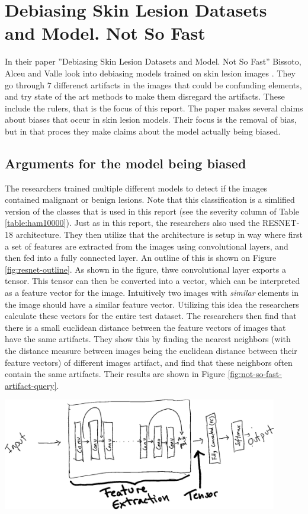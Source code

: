 \section{Debiasing Skin Lesion Datasets and Model. Not So Fast}\label{sec:debias-not-so-fast}
In their paper
''Debiasing Skin Lesion Datasets and Model. Not So Fast''
Bissoto, Alceu and Valle look into debiasing models trained on
skin lesion images \cite{debias-not-so-fast}.
They go through $7$ differenct artifacts in the images that could
be confunding elements, and try state of the art methods to
make them disregard the artifacts.
These include the rulers, that is the focus of this report.
The paper makes several claims about biases that occur in
skin lesion models.
Their focus is the removal of bias, but in that proces they
make claims about the model actually being biased.

\subsection{Arguments for the model being biased}
The researchers trained multiple different models to detect if the
images contained malignant or benign lesions.
Note that this classification is a simlified version of the classes
that is used in this report (see the severity column of Table \ref{table:ham10000}).
Just as in this report, the researchers also used the RESNET-18 architecture.
They then utilize that the architecture is setup in way where first a set of features
are extracted from the images using convolutional layers, and then fed into a fully connected layer. 
An outline of this is shown on Figure \ref{fig:resnet-outline}.
As shown in the figure, thwe convolutional layer exports a tensor.
This tensor can then be converted into a vector, which can be interpreted as a feature vector for the image.
Intuitively two images with \textit{similar} elements in the image should have a similar feature vector.
Utilizing this idea the researchers calculate these vectors for the entire test dataset.
The researchers then find that there is a small euclidean distance between the feature vectors of images
that have the same artifacts.
They show this by finding the nearest neighbors (with the distance measure between images being the euclidean distance between their feature vectors)
of different images artifact, and find that these neighbors often contain the same artifacts.
Their results are shown in Figure \ref{fig:not-so-fast-artifact-query}.


\begin{center}
    \includegraphics[width=0.9\textwidth]{images/resnet-outline.png}
    \label{fig:resnet-outline}
\end{center}

